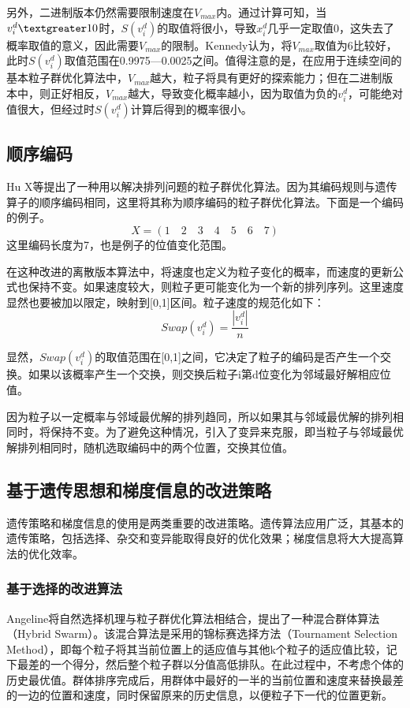 另外，二进制版本仍然需要限制速度在$V_{max}$内。通过计算可知，当$v_i^d\textgreater 10$时，$S(v_i^d)$的取值将很小，导致$x_i^d$几乎一定取值0，这失去了概率取值的意义，因此需要$V_{max}$的限制。Kennedy认为，将$V_{max}$取值为6比较好，此时$S(v_i^d)$取值范围在0.9975—0.0025之间。值得注意的是，在应用于连续空间的基本粒子群优化算法中，$V_{max}$越大，粒子将具有更好的探索能力；但在二进制版本中，则正好相反，$V_{max}$越大，导致变化概率越小，因为取值为负的$v_i^d$，可能绝对值很大，但经过时$S(v_i^d)$计算后得到的概率很小。

\subsection{顺序编码}
Hu X等提出了一种用以解决排列问题的粒子群优化算法\cite{Hu2002Solving}。因为其编码规则与遗传算子的顺序编码相同，这里将其称为顺序编码的粒子群优化算法。下面是一个编码的例子。$$X=(1\quad2\quad3\quad4\quad5\quad6\quad7)$$这里编码长度为7，也是例子的位值变化范围。

在这种改进的离散版本算法中，将速度也定义为粒子变化的概率，而速度的更新公式也保持不变。如果速度较大，则粒子更可能变化为一个新的排列序列。这里速度显然也要被加以限定，映射到[0,1]区间。粒子速度的规范化如下：
\begin{equation}
Swap(v_i^d)=\frac{|v_i^d|}{n}
\end{equation}

显然，$Swap(v_i^d)$的取值范围在[0,1]之间，它决定了粒子的编码是否产生一个交换。如果以该概率产生一个交换，则交换后粒子i第d位变化为邻域最好解相应位值。

因为粒子以一定概率与邻域最优解的排列趋同，所以如果其与邻域最优解的排列相同时，将保持不变。为了避免这种情况，引入了变异来克服，即当粒子与邻域最优解排列相同时，随机选取编码中的两个位置，交换其位值。
\subsection{基于遗传思想和梯度信息的改进策略}
遗传策略和梯度信息的使用是两类重要的改进策略。遗传算法应用广泛，其基本的遗传策略，包括选择、杂交和变异能取得良好的优化效果；梯度信息将大大提高算法的优化效率。
\subsubsection{基于选择的改进算法}
Angeline将自然选择机理与粒子群优化算法相结合，提出了一种混合群体算法（Hybrid Swarm）\cite{Angeline2002Using}。该混合算法是采用的锦标赛选择方法（Tournament Selection Method），即每个粒子将其当前位置上的适应值与其他k个粒子的适应值比较，记下最差的一个得分，然后整个粒子群以分值高低排队。在此过程中，不考虑个体的历史最优值。群体排序完成后，用群体中最好的一半的当前位置和速度来替换最差的一边的位置和速度，同时保留原来的历史信息，以便粒子下一代的位置更新。

